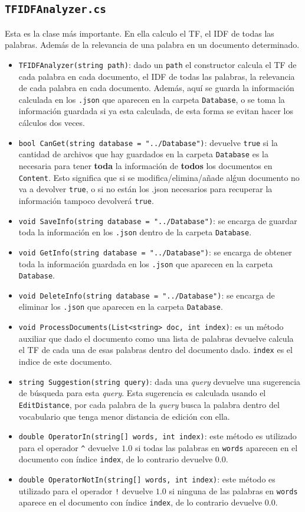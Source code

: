 \documentclass{report}
\begin{document}
\subsection*{\tt TFIDFAnalyzer.cs}

Esta es la clase m\'as importante. En ella calculo el TF, el IDF de todas las palabras. 
Adem\'as de la relevancia de una palabra en un documento determinado.

\begin{itemize}
	\item {\tt TFIDFAnalyzer(string path)}: dado un {\tt path} el constructor calcula el TF 
	de cada palabra en cada documento, el IDF de todas las palabras, la relevancia de cada 
	palabra en cada documento. Adem\'as, aqu\'i se guarda la informaci\'on calculada en los 
	{\tt .json} que aparecen en la carpeta {\tt Database}, o se toma la informaci\'on guardada 
	si ya esta calculada, de esta forma se evitan hacer los c\'alculos dos veces.
	\item {\tt bool CanGet(string database = "../Database")}: devuelve {\tt true} si la cantidad
de archivos que hay guardados en la carpeta {\tt Database} es la necesaria para tener {\bf toda} 
la informaci\'on de {\bf todos} los documentos en {\tt Content}. Esto significa que si se modifica/elimina/a\~nade 
al\'gun documento no va a devolver {\tt true}, o si no est\'an los {.json} necesarios
para recuperar la informaci\'on tampoco devolver\'a {\tt true}.
	\item {\tt void SaveInfo(string database = "../Database")}: se encarga de guardar toda la informaci\'on en los {\tt .json} dentro de la carpeta {\tt Database}.
	\item {\tt void GetInfo(string database = "../Database")}: se encarga de obtener toda la informaci\'on guardada en los {\tt .json} que aparecen en la carpeta {\tt Database}.
	\item {\tt void DeleteInfo(string database = "../Database")}: se encarga de eliminar los {\tt .json} que aparecen en la carpeta {\tt Database}.
	\item {\tt void ProcessDocuments(List<string> doc, int index)}: es un m\'etodo auxiliar que dado el documento como una lista de palabras devuelve calcula el TF de cada una de esas
palabras dentro del documento dado. {\tt index} es el indice de este documento.
	\item {\tt string Suggestion(string query)}: dada una {\it query} devuelve una sugerencia de b\'usqueda para esta {\it query}. Esta sugerencia es calculada 
	usando el {\tt EditDistance}, por cada palabra de la {\it query} busca la palabra dentro del vocabulario que tenga menor distancia de edici\'on con ella.
	\item {\tt double OperatorIn(string[] words, int index)}: este m\'etodo es utilizado para el operador {\tt \^{}} devuelve $1.0$ si todas las palabras en {\tt words} 
	aparecen en el documento con \'indice {\tt index}, de lo contrario devuelve $0.0$.
	\item {\tt double OperatorNotIn(string[] words, int index)}: este m\'etodo es utilizado para el operador {\tt !} devuelve $1.0$ si ninguna de las palabras en {\tt words} 
	aparece en el documento con \'indice {\tt index}, de lo contrario devuelve $0.0$.
\end{itemize}
\end{document}
